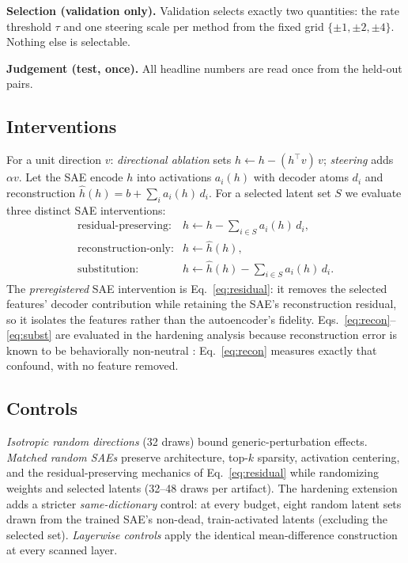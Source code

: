 \documentclass[11pt]{article}
\begin{document}
\textbf{Selection (validation only).}  Validation selects exactly two
quantities: the rate threshold $\tau$ and one steering scale per method from
the fixed grid $\{\pm1,\pm2,\pm4\}$.  Nothing else is selectable.

\textbf{Judgement (test, once).}  All headline numbers are read once from the
held-out pairs.

\subsection{Interventions}
\label{sec:interventions}

For a unit direction $v$: \emph{directional ablation} sets
$h\leftarrow h-(h^{\top}v)\,v$; \emph{steering} adds $\alpha v$.  Let the SAE
encode $h$ into activations $a_i(h)$ with decoder atoms $d_i$ and
reconstruction $\hat h(h)=b+\sum_i a_i(h)\,d_i$.  For a selected latent set
$S$ we evaluate three distinct SAE interventions:
\begin{align}
\text{residual-preserving:} & h\leftarrow h-\textstyle\sum_{i\in S}a_i(h)\,d_i,
\label{eq:residual}\\
\text{reconstruction-only:} & h\leftarrow \hat h(h),
\label{eq:recon}\\
\text{substitution:} & h\leftarrow \hat h(h)-\textstyle\sum_{i\in S}a_i(h)\,d_i.
\label{eq:subst}
\end{align}
The \emph{preregistered} SAE intervention is
Eq.~\eqref{eq:residual}: it removes the selected features' decoder
contribution while retaining the SAE's reconstruction residual, so it isolates
the features rather than the autoencoder's fidelity.
Eqs.~\eqref{eq:recon}--\eqref{eq:subst} are evaluated in the hardening
analysis because reconstruction error is known to be behaviorally
non-neutral \citep{gurnee2024sae}: Eq.~\eqref{eq:recon} measures exactly that
confound, with no feature removed.

\subsection{Controls}
\label{sec:controls}

\emph{Isotropic random directions} (32 draws) bound generic-perturbation
effects.  \emph{Matched random SAEs} preserve architecture, top-$k$ sparsity,
activation centering, and the residual-preserving mechanics of
Eq.~\eqref{eq:residual} while randomizing weights and selected latents
(32--48 draws per artifact).  The hardening extension adds a stricter
\emph{same-dictionary} control: at every budget, eight random latent sets
drawn from the trained SAE's non-dead, train-activated latents (excluding the
selected set).  \emph{Layerwise controls} apply the identical mean-difference
construction at every scanned layer.
\end{document}
